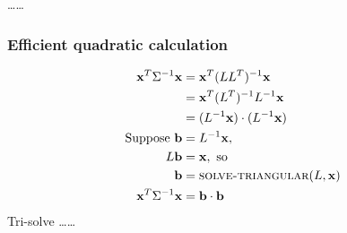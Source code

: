 \documentclass[11pt]{article} %
\def\comment#1{\color{red}#1\color{black}}
\begin{document}
\comment{\ldots\ldots}

\subsubsection{Efficient quadratic calculation}
\begin{align*}
	\mathbf{x}^T\Sigma^{-1}\mathbf{x}
	&= \mathbf{x}^T(LL^T)^{-1}\mathbf{x}\\
	&= \mathbf{x}^T(L^T)^{-1}L^{-1}\mathbf{x}\\
	&= (L^{-1}\mathbf{x})\cdot(L^{-1}\mathbf{x})\\
\textrm{Suppose }\mathbf{b}&=L^{-1}\mathbf{x},\\
	L\mathbf{b}&=\mathbf{x}, \textrm{ so}\\
	\mathbf{b}&= \textsc{solve-triangular}(L, \mathbf{x})\\
	\mathbf{x}^T\Sigma^{-1}\mathbf{x} &= \mathbf{b}\cdot\mathbf{b}
\end{align*}
Tri-solve \comment{\ldots\ldots}



\end{document}
